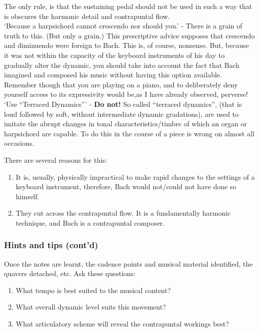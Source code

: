 \documentclass{article}
\begin{document}
The only rule, is that the sustaining pedal should not be used in such a way that is obscures the harmonic detail and contrapuntal flow.\\

`Because a harpsichord cannot crescendo nor should you.' - There is a grain of truth to this.
(But only a grain.)
This prescriptive advice supposes that crescendo and diminuendo were foreign to Bach.
This is, of course, nonsense.
But, because it was not within the capacity of the keyboard instruments of his day to gradually alter the dynamic, you should take into account  the fact that Bach imagined and composed his music without having this option available.
Remember though that you are playing on a piano, and to deliberately deny yourself access to its expressivity would be,as I have already observed, perverse!\\

`Use ``Terraced Dynamics''' - \textbf{Do not!} So called ``terraced dynamics'', (that is loud followed by soft, without intermediate dynamic gradations), are used to imitate the abrupt changes in tonal characteristics/timbre of which an organ or harpsichord are capable.
To do this in the course of a piece is wrong on almost all occasions.

There are several reasons for this:

\begin{enumerate}
    \item It is, usually, physically impractical to make rapid changes to the settings of a keyboard instrument, therefore, Bach would not/could not have done so himself.
    \item They cut across the contrapuntal flow.
        It is a fundamentally harmonic technique, and Bach is a contrapuntal composer.
\end{enumerate}

\subsubsection{Hints and tips (cont'd)}

Once the notes are learnt, the cadence points and musical material identified, the quavers detached, etc.
Ask these questions:

\begin{enumerate}
    \item What tempo is best suited to the musical content?
    \item What overall dynamic level suits this movement?
    \item What articulatory scheme will reveal the contrapuntal workings best?
\end{enumerate}
\end{document}
